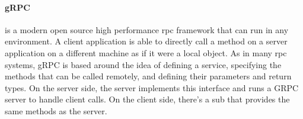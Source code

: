 






\paragraph{\textbf{gRPC}} is a modern open source high performance \acrfull{rpc} framework that can run in any environment. A client application is able to directly call a method on a server application on a different machine as if it were a local object. As in many \acrshort{rpc} systems, gRPC is based around the idea of defining a service, specifying the methods that can be called remotely, and defining their parameters and return types. On the server side, the server implements this interface and runs a GRPC server to handle client calls. On the client side, there's a sub that provides the same methods as the server.


